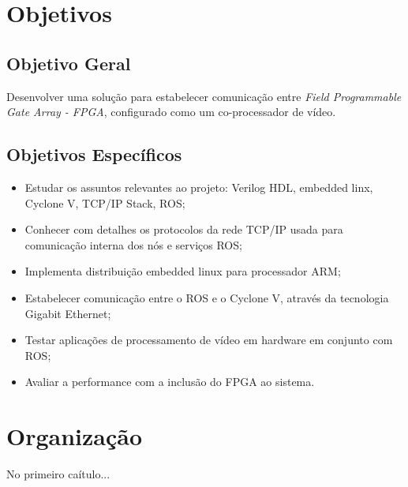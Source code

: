 
\section{Objetivos}

\subsection{Objetivo Geral}

Desenvolver uma solução para estabelecer comunicação entre \textit{Field Programmable Gate Array - FPGA}, 
configurado como um co-processador de vídeo.

\subsection{Objetivos Específicos}

\begin{itemize}
    \item Estudar os assuntos relevantes ao projeto: Verilog HDL, embedded linx,  Cyclone V, 
    TCP/IP Stack, ROS;
    \item Conhecer com detalhes os protocolos da rede TCP/IP usada para comunicação interna dos 
    nós e serviços ROS;
    \item Implementa distribuição embedded linux para processador ARM;
    \item Estabelecer comunicação entre o ROS e o Cyclone V, através da tecnologia Gigabit Ethernet;
    \item Testar aplicações de processamento de vídeo em hardware em conjunto com ROS;
    \item Avaliar a performance com a inclusão do FPGA ao sistema.
\end{itemize}


\section{Organização}

 No primeiro caítulo...